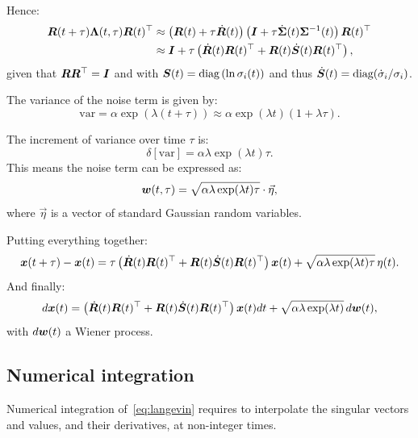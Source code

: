 \documentclass{article} %
\begin{document}
Hence:
\begin{align*}
     {\bm{R}}(t+\tau) \mathbf{\Lambda}(t, \tau) {\bm{R}}(t)^{\top} &\approx 
     \left( {\bm{R}}(t) + \tau \dot{{\bm{R}}}(t) \right) \left( {\bm{I}} + \tau \dot{\mathbf{\Sigma}}(t) \mathbf{\Sigma}^{-1}(t) \right) {\bm{R}}(t)^{\top} \\
     &\approx {\bm{I}} + \tau \left( \dot{{\bm{R}}}(t) {\bm{R}}(t)^{\top} + {\bm{R}}(t) \dot{{\bm{S}}}(t) {\bm{R}}(t)^{\top} \right),
\end{align*}
given that ${\bm{R}}{\bm{R}}^{\top} = {\bm{I}}$ and with ${\bm{S}}(t) = \text{diag}\left(\ln{\sigma_i(t)}\right)$ and thus $\dot{{\bm{S}}}(t) = \text{diag}(\dot{\sigma}_i/\sigma_i)$.

The variance of the noise term is given by:
\begin{equation*}
    \text{var} = \alpha \exp(\lambda(t+\tau)) \approx \alpha \exp(\lambda t) (1 + \lambda \tau).
\end{equation*}

The increment of variance over time  $\tau$ is:
\begin{equation*}
    \delta[\text{var}] = \alpha \lambda \exp(\lambda t) \tau.
\end{equation*}
This means the noise term can be expressed as:
\begin{equation*}
    {\bm{w}} (t, \tau) = \sqrt{\alpha \lambda \exp(\lambda t) \tau} \cdot \vec{\eta},
\end{equation*}
where $\vec{\eta}$ is a vector of standard Gaussian random variables.

Putting everything together:
\begin{equation*}
    {\bm{x}} (t + \tau) - {\bm{x}} (t) = \tau \left( \dot{{\bm{R}}}(t) {\bm{R}}(t)^{\top} + {\bm{R}}(t) \dot{{\bm{S}}}(t) {\bm{R}}(t)^{\top} \right) {\bm{x}} (t) + \sqrt{\alpha \lambda \exp(\lambda t) \tau} \, \mathbf{\eta} (t).
\end{equation*}
And finally:
\begin{equation*}
    d{\bm{x}} (t) = \left( \dot{{\bm{R}}}(t) {\bm{R}}(t)^{\top} + {\bm{R}}(t) \dot{{\bm{S}}}(t) {\bm{R}}(t)^{\top} \right) {\bm{x}}(t) dt + \sqrt{\alpha \lambda \exp(\lambda t)} \, d{\bm{w}}(t),
\end{equation*}
with $d{\bm{w}}(t)$ a Wiener process.

\subsection{Numerical integration}
\label{app:simulations}

Numerical integration of~\cref{eq:langevin} requires to interpolate the singular vectors and values, and their derivatives, at non-integer times.
\end{document}
